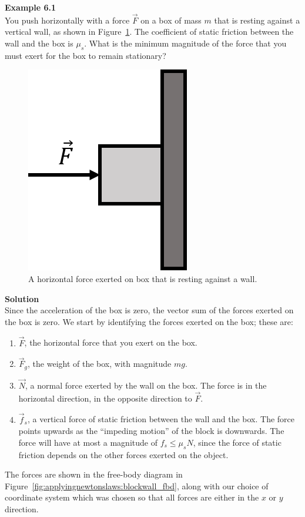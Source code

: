 \begin{framed}
\textbf{Example 6.1}\\
You push horizontally with a force $\vec F$ on a box of mass $m$ that is resting against a vertical wall, as shown in Figure~\ref{fig:applyingnewtonslaws:blockwall}. The coefficient of static friction between the wall and the box is $\mu_s$. What is the minimum magnitude of the force that you must exert for the box to remain stationary?

\begin{figure}[!htbp]
\centering
\includegraphics[width=0.2\linewidth]{files/blockwall-4c9d39aeb582ba18ba06ff1f9b6bb5dc.png}
\caption[]{A horizontal force exerted on box that is resting against a wall.}
\label{fig:applyingnewtonslaws:blockwall}
\end{figure}

\begin{framed}
\textbf{Solution}\\
Since the acceleration of the box is zero, the vector sum of the forces exerted on the box is zero. We start by identifying the forces exerted on the box; these are:

\begin{enumerate}
\item $\vec F$, the horizontal force that you exert on the box.
\item $\vec F_g$, the weight of the box, with magnitude $mg$.
\item $\vec N$, a normal force exerted by the wall on the box. The force is in the horizontal direction, in the opposite direction to $\vec F$.
\item $\vec f_s$, a vertical force of static friction between the wall and the box. The force points upwards as the ``impeding motion'' of the block is downwards. The force will have at most a magnitude of $f_s\leq\mu_s N$, since the force of static friction depends on the other forces exerted on the object.
\end{enumerate}

The forces are shown in the free-body diagram in Figure~\ref{fig:applyingnewtonslaws:blockwall_fbd}, along with our choice of coordinate system which was chosen so that all forces are either in the $x$ or $y$ direction.


\end{framed}
\end{framed}
